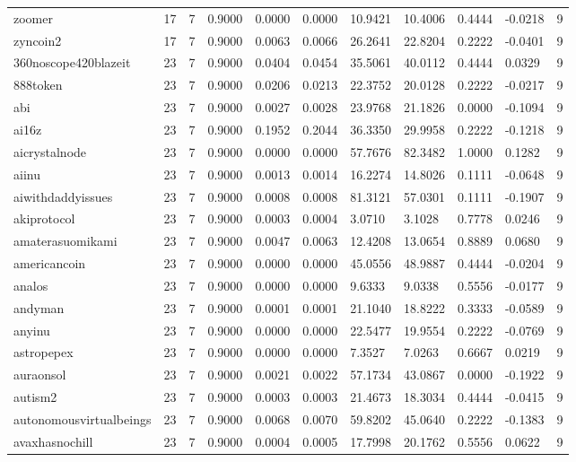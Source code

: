 \begin{table}[htbp]
\begin{tabular}{lllllllllll}
zoomer & 17 & 7 & 0.9000 & 0.0000 & 0.0000 & 10.9421 & 10.4006 & 0.4444 & -0.0218 & 9 \\
zyncoin2 & 17 & 7 & 0.9000 & 0.0063 & 0.0066 & 26.2641 & 22.8204 & 0.2222 & -0.0401 & 9 \\
360noscope420blazeit & 23 & 7 & 0.9000 & 0.0404 & 0.0454 & 35.5061 & 40.0112 & 0.4444 & 0.0329 & 9 \\
888token & 23 & 7 & 0.9000 & 0.0206 & 0.0213 & 22.3752 & 20.0128 & 0.2222 & -0.0217 & 9 \\
abi & 23 & 7 & 0.9000 & 0.0027 & 0.0028 & 23.9768 & 21.1826 & 0.0000 & -0.1094 & 9 \\
ai16z & 23 & 7 & 0.9000 & 0.1952 & 0.2044 & 36.3350 & 29.9958 & 0.2222 & -0.1218 & 9 \\
aicrystalnode & 23 & 7 & 0.9000 & 0.0000 & 0.0000 & 57.7676 & 82.3482 & 1.0000 & 0.1282 & 9 \\
aiinu & 23 & 7 & 0.9000 & 0.0013 & 0.0014 & 16.2274 & 14.8026 & 0.1111 & -0.0648 & 9 \\
aiwithdaddyissues & 23 & 7 & 0.9000 & 0.0008 & 0.0008 & 81.3121 & 57.0301 & 0.1111 & -0.1907 & 9 \\
akiprotocol & 23 & 7 & 0.9000 & 0.0003 & 0.0004 & 3.0710 & 3.1028 & 0.7778 & 0.0246 & 9 \\
amaterasuomikami & 23 & 7 & 0.9000 & 0.0047 & 0.0063 & 12.4208 & 13.0654 & 0.8889 & 0.0680 & 9 \\
americancoin & 23 & 7 & 0.9000 & 0.0000 & 0.0000 & 45.0556 & 48.9887 & 0.4444 & -0.0204 & 9 \\
analos & 23 & 7 & 0.9000 & 0.0000 & 0.0000 & 9.6333 & 9.0338 & 0.5556 & -0.0177 & 9 \\
andyman & 23 & 7 & 0.9000 & 0.0001 & 0.0001 & 21.1040 & 18.8222 & 0.3333 & -0.0589 & 9 \\
anyinu & 23 & 7 & 0.9000 & 0.0000 & 0.0000 & 22.5477 & 19.9554 & 0.2222 & -0.0769 & 9 \\
astropepex & 23 & 7 & 0.9000 & 0.0000 & 0.0000 & 7.3527 & 7.0263 & 0.6667 & 0.0219 & 9 \\
auraonsol & 23 & 7 & 0.9000 & 0.0021 & 0.0022 & 57.1734 & 43.0867 & 0.0000 & -0.1922 & 9 \\
autism2 & 23 & 7 & 0.9000 & 0.0003 & 0.0003 & 21.4673 & 18.3034 & 0.4444 & -0.0415 & 9 \\
autonomousvirtualbeings & 23 & 7 & 0.9000 & 0.0068 & 0.0070 & 59.8202 & 45.0640 & 0.2222 & -0.1383 & 9 \\
avaxhasnochill & 23 & 7 & 0.9000 & 0.0004 & 0.0005 & 17.7998 & 20.1762 & 0.5556 & 0.0622 & 9 \\

\end{tabular}
\end{table}
